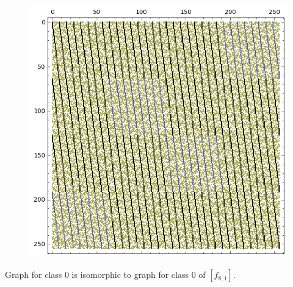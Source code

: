\documentclass[pdf,sprung,slideColor,nocolorBG]{beamer}
\newenvironment{colortheme}[1]{
\def\ProvidesPackageRCS $##1${\relax}
\renewcommand{\ProcessOptions}{\relax}
\makeatletter

\makeatother
}{}
\begin{document}
\begin{colortheme}{jubata}
\begin{frame}
\begin{figure}
\begin{minipage}{.48\textwidth}
  \label{fig:8_2_weight_class_matrix}
\end{minipage}%
\begin{minipage}{.48\textwidth}
  \centering
  \includegraphics[width=.9\linewidth]{../matrix_plot/re8_2_bent_cayley_graph_index_matrix.png}
  \label{fig:8_2_bent_cayley_graph_index_matrix}
\end{minipage}
\end{figure}
Graph for class 0 is isomorphic to graph for class 0 of $[f_{8,1}]$.
\end{frame}

\end{colortheme}
\end{document}
